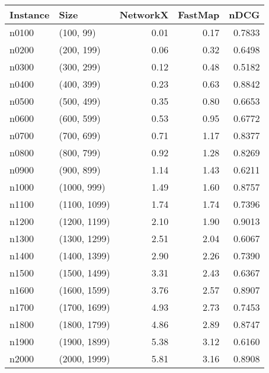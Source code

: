 \begin{tabular}{llrrr}
\toprule
Instance &         Size &  NetworkX &  FastMap &   nDCG \\
\midrule
   n0100 &    (100, 99) &      0.01 &     0.17 & 0.7833 \\
   n0200 &   (200, 199) &      0.06 &     0.32 & 0.6498 \\
   n0300 &   (300, 299) &      0.12 &     0.48 & 0.5182 \\
   n0400 &   (400, 399) &      0.23 &     0.63 & 0.8842 \\
   n0500 &   (500, 499) &      0.35 &     0.80 & 0.6653 \\
   n0600 &   (600, 599) &      0.53 &     0.95 & 0.6772 \\
   n0700 &   (700, 699) &      0.71 &     1.17 & 0.8377 \\
   n0800 &   (800, 799) &      0.92 &     1.28 & 0.8269 \\
   n0900 &   (900, 899) &      1.14 &     1.43 & 0.6211 \\
   n1000 &  (1000, 999) &      1.49 &     1.60 & 0.8757 \\
   n1100 & (1100, 1099) &      1.74 &     1.74 & 0.7396 \\
   n1200 & (1200, 1199) &      2.10 &     1.90 & 0.9013 \\
   n1300 & (1300, 1299) &      2.51 &     2.04 & 0.6067 \\
   n1400 & (1400, 1399) &      2.90 &     2.26 & 0.7390 \\
   n1500 & (1500, 1499) &      3.31 &     2.43 & 0.6367 \\
   n1600 & (1600, 1599) &      3.76 &     2.57 & 0.8907 \\
   n1700 & (1700, 1699) &      4.93 &     2.73 & 0.7453 \\
   n1800 & (1800, 1799) &      4.86 &     2.89 & 0.8747 \\
   n1900 & (1900, 1899) &      5.38 &     3.12 & 0.6160 \\
   n2000 & (2000, 1999) &      5.81 &     3.16 & 0.8908 \\
\bottomrule
\end{tabular}
